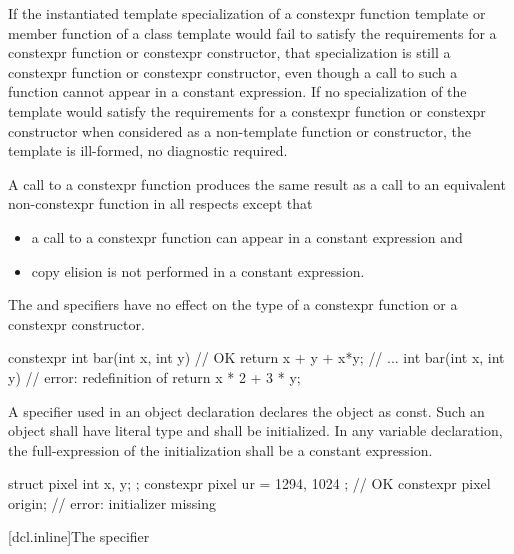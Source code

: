 \pnum
If the instantiated template specialization of a constexpr function
template
or member function of a class template
would fail to satisfy the requirements for a constexpr
function or constexpr constructor,
that specialization is still a constexpr function or constexpr
constructor, even though a call to such a function cannot appear in a constant
expression. If no specialization of the template would satisfy the
requirements for a constexpr function or constexpr constructor
when considered as a non-template function or constructor, the template is
ill-formed, no diagnostic required.

\pnum
A call to a constexpr function produces the same result as a call to an equivalent
non-constexpr function in all respects except that
\begin{itemize}
\item
a call to a constexpr
function can appear in a constant expression and
\item
copy elision is not performed in a constant expression.
\end{itemize}

\pnum
The  and  specifiers have no
effect on the type of a constexpr function or a constexpr constructor.
\begin{example}
\begin{codeblock}
constexpr int bar(int x, int y)         // OK
    { return x + y + x*y; }
// ...
int bar(int x, int y)                   // error: redefinition of 
    { return x * 2 + 3 * y; }
\end{codeblock}
\end{example}

\pnum
A  specifier used in an object declaration
declares the object as const.
Such an object
shall have literal type and
shall be initialized.
In any  variable declaration,
the full-expression of the initialization
shall be a constant expression.
\begin{example}
\begin{codeblock}
struct pixel {
  int x, y;
};
constexpr pixel ur = { 1294, 1024 };    // OK
constexpr pixel origin;                 // error: initializer missing
\end{codeblock}
\end{example}

[dcl.inline]{The  specifier}%


